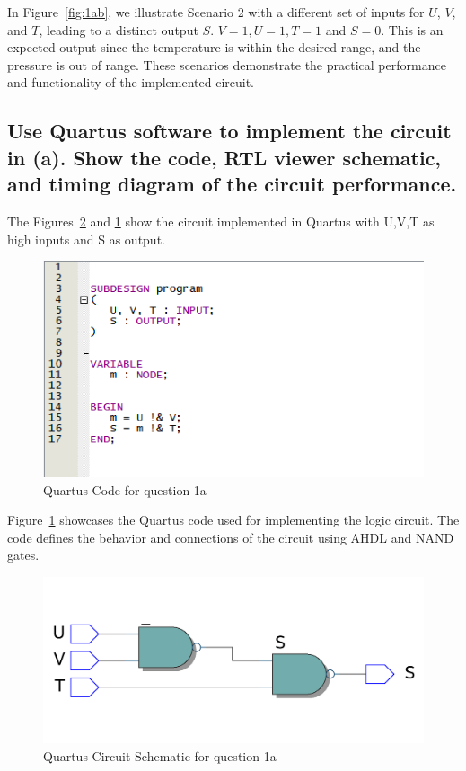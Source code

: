 \documentclass[a4paper,12]{article}
\begin{document}
In Figure~\ref{fig:1ab}, we illustrate Scenario 2 with a different set of inputs for $U$, $V$, and $T$, leading to a distinct output $S$. $ V = 1, U = 1, T = 1$ and $S = 0$. This is an expected output since the temperature is within the desired range, and the pressure is out of range.
These scenarios demonstrate the practical performance and functionality of the implemented circuit.




\subsection {Use Quartus software to implement the circuit in (a). Show the code, RTL viewer schematic, and timing diagram of the circuit performance.}
The Figures~\ref{fig:1ac} and \ref{fig:1ad} show the circuit implemented in Quartus with U,V,T as high inputs and S as output.

\begin{figure}[H]
    \centering
    \includegraphics[width=\textwidth]{q1code.png}
    \caption{Quartus Code for question 1a}
    \label{fig:1ad}                                                                                                                               
\end{figure}

Figure~\ref{fig:1ad} showcases the Quartus code used for implementing the logic circuit. The code defines the behavior and connections of the circuit using AHDL and NAND gates.

\begin{figure}[H]
    \centering
    \includegraphics[width=\textwidth]{q1q1.png}
    \caption{Quartus Circuit Schematic for question 1a}
    \label{fig:1ac}
\end{figure}
\end{document}
